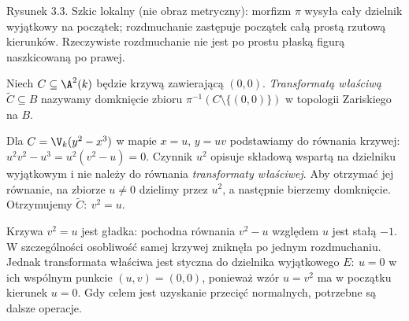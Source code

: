 \noindent\begin{minipage}{\linewidth}\centering
{}

\small Rysunek 3.3. Szkic lokalny (nie obraz metryczny): morfizm $\pi$ wysyła cały dzielnik wyjątkowy na początek; rozdmuchanie zastępuje początek
całą prostą rzutową kierunków. Rzeczywiste rozdmuchanie nie jest
po prostu płaską figurą naszkicowaną po prawej.
\end{minipage}

\begin{definicja}
Niech $C\subseteq\A^2(k)$ będzie krzywą zawierającą
$(0,0)$. \emph{Transformatą właściwą} $\widetilde C\subseteq B$
nazywamy domknięcie zbioru $\pi^{-1}(C\setminus\{(0,0)\})$
w topologii Zariskiego na $B$.
\end{definicja}

\begin{przyklad}
Dla $C=\V_k(y^2-x^3)$ w mapie $x=u$, $y=uv$
podstawiamy do równania krzywej:
$u^2v^2-u^3=u^2(v^2-u)=0$.
Czynnik $u^2$ opisuje składową wspartą na dzielniku
wyjątkowym i nie należy do równania \emph{transformaty
właściwej}. Aby otrzymać jej równanie, na zbiorze $u\ne0$
dzielimy przez $u^2$, a następnie bierzemy domknięcie.
Otrzymujemy $\widetilde C:\ v^2=u$.

Krzywa $v^2=u$ jest gładka: pochodna równania
$v^2-u$ względem $u$ jest stałą $-1$.
W szczególności osobliwość samej krzywej zniknęła po
jednym rozdmuchaniu. Jednak transformata właściwa
jest styczna do dzielnika wyjątkowego $E:\ u=0$
w ich wspólnym punkcie $(u,v)=(0,0)$, ponieważ
wzór $u=v^2$ ma w początku kierunek $u=0$.
Gdy celem jest uzyskanie przecięć normalnych, potrzebne
są dalsze operacje.
\end{przyklad}

